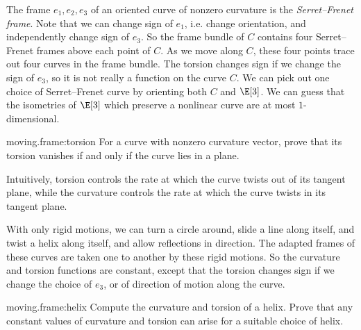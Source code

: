 The frame \(e_1, e_2, e_3\) of an oriented curve of nonzero curvature is the \emph{Serret--Frenet frame}.
Note that we can change sign of \(e_1\), i.e. change orientation, and independently change sign of \(e_3\).
So the frame bundle of \(C\) contains four Serret--Frenet frames above each point of \(C\).
As we move along \(C\), these four points trace out four curves in the frame bundle.
The torsion changes sign if we change the sign of \(e_3\), so it is not really a function on the curve \(C\).
We can pick out one choice of Serret--Frenet curve by orienting both \(C\) and \(\E[3]\).
We can guess that the isometries of \(\E[3]\) which preserve a nonlinear curve are at most \(1\)-dimensional.
\begin{problem}{moving.frame:torsion}
For a curve with nonzero curvature vector, prove that its torsion vanishes if and only if the curve lies in a plane.
\end{problem}
\begin{example}
Intuitively, torsion controls the rate at which the curve twists out of its tangent plane, while the curvature controls the rate at which the curve twists in its tangent plane.
\end{example}
\begin{example}
With only rigid motions, we can turn a circle around, slide a line along itself, and twist a helix along itself, and allow reflections in direction.
The adapted frames of these curves are taken one to another by these rigid motions.
So the curvature and torsion functions are constant, except that the torsion changes sign if we change the choice of \(e_3\), or of direction of motion along the curve.
\end{example}
\begin{problem}{moving.frame:helix}
Compute the curvature and torsion of a helix.
Prove that any constant values of curvature and torsion can arise for a suitable choice of helix.
\end{problem}
